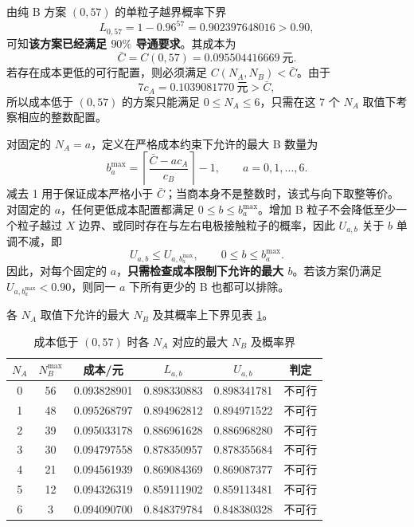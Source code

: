 \documentclass[withoutpreface,bwprint]{cumcmthesis}
\begin{document}
由纯 B 方案 $(0,57)$ 的单粒子越界概率下界
\begin{equation}
L_{0,57}=1-0.96^{57}=0.902397648016>0.90,
\label{eq:q4-incumbent-feasible}
\end{equation}
可知\textbf{该方案已经满足 $90\%$ 导通要求}。其成本为
\begin{equation}
\bar C=C(0,57)=0.095504416669\ \text{元}.
\label{eq:q4-cstar}
\end{equation}
若存在成本更低的可行配置，则必须满足 $C(N_A,N_B)<\bar C$。由于
\[
7c_A=0.1039081770\ \text{元}>\bar C,
\]
所以成本低于 $(0,57)$ 的方案只能满足 $0\le N_A\le6$，只需在这 7 个 $N_A$ 取值下考察相应的整数配置。

对固定的 $N_A=a$，定义在严格成本约束下允许的最大 B 数量为
\begin{equation}
 b_a^{\max}
 =\left\lceil\frac{\bar C-ac_A}{c_B}\right\rceil-1,
 \qquad a=0,1,\ldots,6.
 \label{eq:q4-bmax}
\end{equation}
减去 1 用于保证成本严格小于 $\bar C$；当商本身不是整数时，该式与向下取整等价。对固定的 $a$，任何更低成本配置都满足 $0\le b\le b_a^{\max}$。增加 B 粒子不会降低至少一个粒子越过 $X$ 边界、或同时存在与左右电极接触粒子的概率，因此 $U_{a,b}$ 关于 $b$ 单调不减，即
\[
U_{a,b}\le U_{a,b_a^{\max}},\qquad 0\le b\le b_a^{\max}.
\]
因此，对每个固定的 $a$，\textbf{只需检查成本限制下允许的最大 $b$}。若该方案仍满足 $U_{a,b_a^{\max}}<0.90$，则同一 $a$ 下所有更少的 B 也都可以排除。

各 $N_A$ 取值下允许的最大 $N_B$ 及其概率上下界见表 \ref{tab:q4-frontier}。

\begin{table}[H]
\centering
\small
\caption{成本低于 $(0,57)$ 时各 $N_A$ 对应的最大 $N_B$ 及概率界}
\label{tab:q4-frontier}
\begin{tabular}{cccccc}
\toprule
$N_A$ & $N_B^{\max}$ & 成本/元 & $L_{a,b}$ & $U_{a,b}$ & 判定 \\
\midrule
0 & 56 & 0.093828901 & 0.898330883 & 0.898341781 & 不可行 \\
1 & 48 & 0.095268797 & 0.894962812 & 0.894971522 & 不可行 \\
2 & 39 & 0.095033178 & 0.886961628 & 0.886968280 & 不可行 \\
3 & 30 & 0.094797558 & 0.878350957 & 0.878355684 & 不可行 \\
4 & 21 & 0.094561939 & 0.869084369 & 0.869087377 & 不可行 \\
5 & 12 & 0.094326319 & 0.859111902 & 0.859113481 & 不可行 \\
6 & 3  & 0.094090700 & 0.848379784 & 0.848380328 & 不可行 \\
\bottomrule
\end{tabular}
\end{table}
\end{document}
